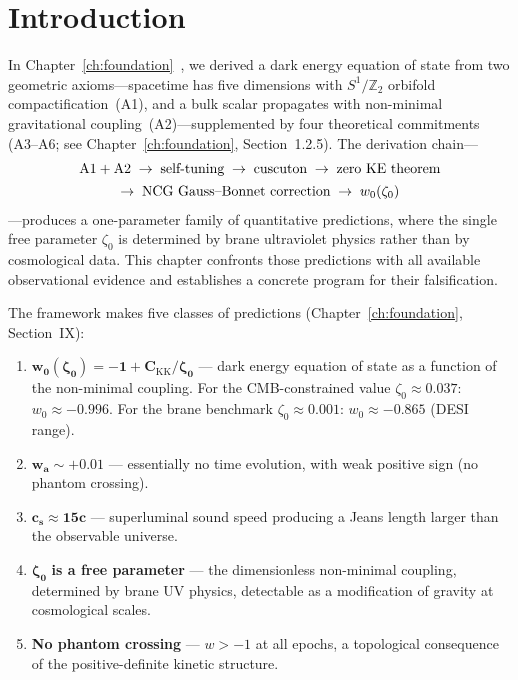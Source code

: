 \section{Introduction}
\label{sec:2-intro}

In Chapter~\ref{ch:foundation}~\cite{ch2:PaperI}, we derived a dark energy equation of state from two geometric axioms---spacetime has five dimensions with $S^1/\mathbb{Z}_2$ orbifold compactification~(A1), and a bulk scalar propagates with non-minimal gravitational coupling~(A2)---supplemented by four theoretical commitments (A3--A6; see Chapter~\ref{ch:foundation}, Section~1.2.5). The derivation chain---
\begin{equation}
\begin{array}{@{}c@{}}
\text{A1} + \text{A2} \;\to\; \text{self-tuning} \;\to\; \text{cuscuton} \;\to\; \text{zero KE theorem} \\[4pt]
\to\; \text{NCG Gauss--Bonnet correction} \;\to\; w_0(\zeta_0)
\end{array}
\label{eq:2-chain}
\end{equation}
---produces a one-parameter family of quantitative predictions, where the single free parameter $\zeta_0$ is determined by brane ultraviolet physics rather than by cosmological data. This chapter confronts those predictions with all available observational evidence and establishes a concrete program for their falsification.

The framework makes five classes of predictions (Chapter~\ref{ch:foundation}, Section~IX):
\begin{enumerate}
    \item $\mathbf{w_0(\zeta_0) = -1 + C_\mathrm{KK}/\zeta_0}$ --- dark energy equation of state as a function of the non-minimal coupling. For the CMB-constrained value $\zeta_0 \approx 0.037$: $w_0 \approx -0.996$. For the brane benchmark $\zeta_0 \approx 0.001$: $w_0 \approx -0.865$ (DESI range).
    \item $\mathbf{w_a \sim +0.01}$ --- essentially no time evolution, with weak positive sign (no phantom crossing).
    \item $\mathbf{c_s \approx 15c}$ --- superluminal sound speed producing a Jeans length larger than the observable universe.
    \item $\boldsymbol{\zeta_0}$ \textbf{is a free parameter} --- the dimensionless non-minimal coupling, determined by brane UV physics, detectable as a modification of gravity at cosmological scales.
    \item \textbf{No phantom crossing} --- $w > -1$ at all epochs, a topological consequence of the positive-definite kinetic structure.
\end{enumerate}

